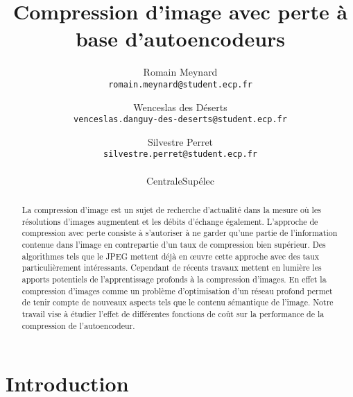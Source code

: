 \documentclass[10pt,twocolumn,letterpaper]{article}
\begin{document}
\title{Compression d'image avec perte à base d'autoencodeurs}

\author{Romain Meynard\\
{\tt\small romain.meynard@student.ecp.fr}
\and
Wenceslas des Déserts \\
{\tt\small venceslas.danguy-des-deserts@student.ecp.fr}
\and
Silvestre Perret \\
{\tt\small silvestre.perret@student.ecp.fr}	 \\
\\
CentraleSupélec\\
}

\maketitle

\begin{abstract}
La compression d'image est un sujet de recherche d'actualité dans la mesure où les résolutions d'images augmentent et les débits d'échange également. L'approche de compression avec perte consiste à s'autoriser à ne garder qu'une partie de l'information contenue dans l'image en contrepartie d'un taux de compression bien supérieur. Des algorithmes tels que le JPEG mettent déjà en œuvre cette approche avec des taux particulièrement intéressants. Cependant de récents travaux mettent en lumière les apports potentiels de l'apprentissage profonds à la compression d'images. En effet la compression d'images comme un problème d'optimisation d'un réseau profond permet de tenir compte de nouveaux aspects tels que le contenu sémantique de l'image. Notre travail vise à étudier l'effet de différentes fonctions de coût sur la performance de la compression de l'autoencodeur.

\end{abstract}

\section{Introduction}
\end{document}
